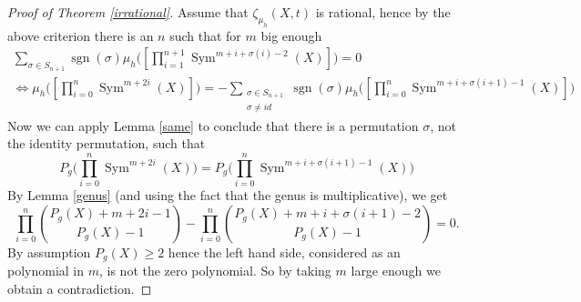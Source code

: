\documentclass[11pt, a4paper, german]{article}
\theoremstyle{plain}
\theoremstyle{definition}
\DeclareMathOperator{\Sym}{Sym}
\DeclareMathOperator{\sgn}{sgn}
\begin{document}
\begin{proof}[Proof of Theorem \ref{irrational}]
    Assume that $\zeta_{\mu_h}(X,t)$ is rational, hence by the above criterion there is an $n$ such that for $m$ big enough
    \begin{gather*}
        \sum_{\sigma \in S_{n+1}} \sgn(\sigma) \mu_h \Big(\left[ \prod_{i=1}^{n+1} \Sym^{m + i + \sigma(i) - 2}(X)\right]\Big)  = 0 \\ 
            \Leftrightarrow
            \mu_h \Big ( \left[ \prod_{i=0}^n \Sym^{m + 2i}(X) \right] \Big )  = - \sum_{\substack{\sigma \in S_{n+1} \\ \sigma \neq id}} 
            \sgn(\sigma) \mu_h \Big ( \left[\prod_{i=0}^n \Sym^{m + i + \sigma(i+1) - 1}(X) \right]\Big )
    \end{gather*}
    Now we can apply Lemma \ref{same} to conclude that there is a permutation $\sigma$, not the identity permutation, such that
    \[
        P_g \Big(\prod_{i=0}^n \Sym^{m+2i}(X)\Big) = P_g \Big( \prod_{i=0}^n \Sym^{m+i+\sigma(i+1) - 1}(X) \Big)
    \]
    By Lemma \ref{genus} (and using the fact that the genus is multiplicative), we get
    \[
        \prod_{i=0}^n \binom{P_g(X) + m + 2i - 1}{P_g(X) - 1} - \prod_{i=0}^n \binom{P_g(X) + m + i + \sigma(i+1) - 2}{P_g(X) - 1} = 0.
    \]
    By assumption $P_g(X) \geq 2$ hence the left hand side, considered as an polynomial in $m$, is not the zero polynomial. So by taking
    $m$ large enough we obtain a contradiction.
\end{proof}




{}

\end{document}
